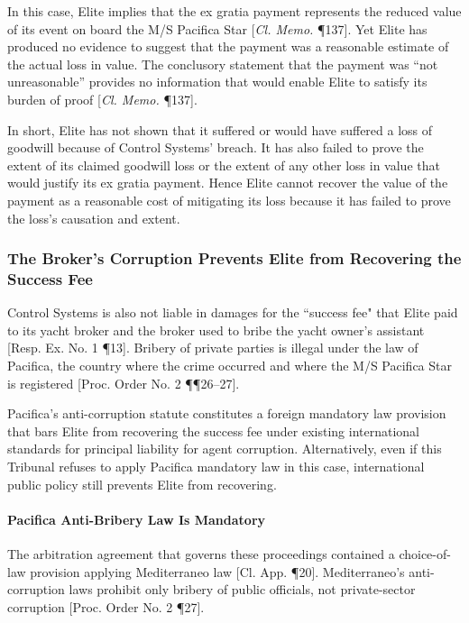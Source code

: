 In this case, Elite implies that the ex gratia payment represents the reduced value of its event on board the M/S Pacifica Star [\textit{Cl. Memo.} \P 137]. Yet Elite has produced no evidence to suggest that the payment was a reasonable estimate of the actual loss in value. The conclusory statement that the payment was ``not unreasonable'' provides no information that would enable Elite to satisfy its burden of proof [\textit{Cl. Memo.} \P 137].

In short, Elite has not shown that it suffered or would have suffered a loss of goodwill because of Control Systems' breach. It has also failed to prove the extent of its claimed goodwill loss or the extent of any other loss in value that would justify its ex gratia payment. Hence Elite cannot recover the value of the payment as a reasonable cost of mitigating its loss because it has failed to prove the loss's causation and extent.

\subsubsection{The Broker's Corruption Prevents Elite from Recovering the Success Fee}

Control Systems is also not liable in damages for the ``success fee" that Elite paid to its yacht broker and the broker used to bribe the yacht owner's assistant [Resp. Ex. No. 1 \P 13]. Bribery of private parties is illegal under the law of Pacifica, the country where the crime occurred and where the M/S Pacifica Star is registered [Proc. Order No. 2 \P\P 26--27].  

Pacifica's anti-corruption statute constitutes a foreign mandatory law provision that bars Elite from recovering the success fee under existing international standards for principal liability for agent corruption.  Alternatively, even if this Tribunal refuses to apply Pacifica mandatory law in this case, international public policy still prevents Elite from recovering.

\paragraph{Pacifica Anti-Bribery Law Is Mandatory}

The arbitration agreement that governs these proceedings contained a choice-of-law provision applying Mediterraneo law [Cl. App. \P 20].  Mediterraneo's anti-corruption laws prohibit only bribery of public officials, not private-sector corruption [Proc. Order No. 2 \P 27].

